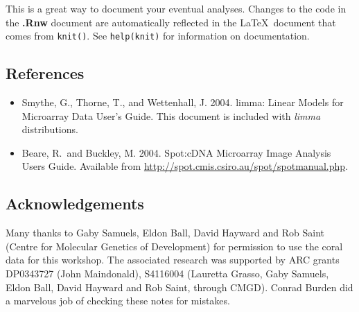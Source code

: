 \documentclass[a4paper,9pt]{article}\usepackage[]{graphicx}\usepackage[]{color}
\begin{document}
This is a great way to document your eventual analyses.  Changes to
the code in the \textbf{.Rnw} document are automatically reflected
in the \LaTeX\ document that comes from \texttt{knit()}.
See \texttt{help(knit)} for information on documentation.

\subsection*{References}
\begin{itemize}
\item[] Smythe, G., Thorne, T., and Wettenhall, J. 2004. limma: Linear
Models for Microarray Data User's Guide.  This document is included
with \textit{limma} distributions.
\item[] Beare, R.\ and Buckley, M. 2004. Spot:cDNA Microarray Image
Analysis Users Guide.
Available from \url{http://spot.cmis.csiro.au/spot/spotmanual.php}.
\end{itemize}

\subsection*{Acknowledgements}
Many thanks to Gaby Samuels, Eldon Ball, David Hayward and Rob Saint
(Centre for Molecular Genetics of Development) for permission to use
the coral data for this workshop.  The associated research was
supported by ARC grants DP0343727 (John Maindonald), S4116004
(Lauretta Grasso, Gaby Samuels, Eldon Ball, David Hayward and Rob
Saint, through CMGD).  Conrad Burden did a marvelous job of checking
these notes for mistakes.
\end{document}
